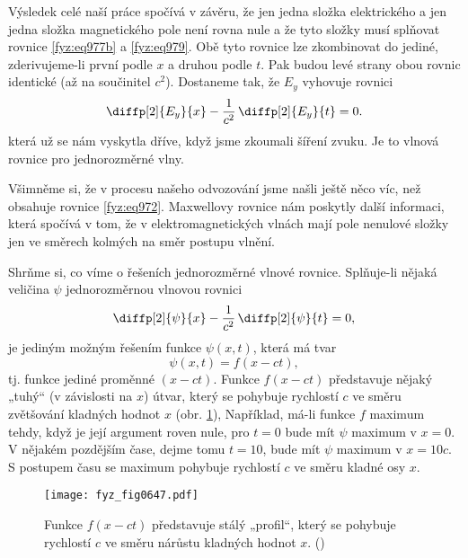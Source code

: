     Výsledek celé naší práce spočívá v závěru, že jen jedna složka elektrického a jen jedna složka
    magnetického pole není rovna nule a že tyto složky musí splňovat rovnice \eqref{fyz:eq977b} a
    \eqref{fyz:eq979}. Obě tyto rovnice lze zkombinovat do jediné, zderivujeme-li první podle \(x\)
    a druhou podle \(t\). Pak budou levé strany obou rovnic identické (až na součinitel \(c^2\)).
    Dostaneme tak, že \(E_y\) vyhovuje rovnici
    \begin{equation}\label{fyz:eq980}
      \diffp[2]{E_y}{x}-\dfrac{1}{c^2}\,\diffp[2]{E_y}{t}=0.
    \end{equation}
    která už se nám vyskytla dříve, když jsme zkoumali šíření zvuku. Je to vlnová rovnice pro
    jednorozměrné vlny.

    Všimněme si, že v procesu našeho odvozování jsme našli ještě něco víc, než obsahuje rovnice
    \eqref{fyz:eq972}. Maxwellovy rovnice nám poskytly další informaci, která spočívá v tom, že v
    elektromagnetických vlnách mají pole nenulové složky jen ve směrech kolmých na směr postupu
    vlnění.
    
    Shrňme si, co víme o řešeních jednorozměrné vlnové rovnice. Splňuje-li nějaká veličina
    \(\psi\) jednorozměrnou vlnovou rovnici
    \begin{equation}\label{fyz:eq981}
      \diffp[2]{\psi}{x}-\dfrac{1}{c^2}\,\diffp[2]{\psi}{t}=0,
    \end{equation}
    je jediným možným řešením funkce \(\psi(x, t)\), která má tvar
    \begin{equation}\label{fyz:eq982}
      \psi(x,t)=f(x-ct),
    \end{equation}
    tj. funkce jediné proměnné \((x - ct)\). Funkce \(f(x- ct)\) představuje nějaký „tuhý“ (v
    závislosti na \(x\)) útvar, který se pohybuje rychlostí \(c\) ve směru zvětšování kladných
    hodnot \(x\) (obr. \ref{fyz:fig0647}), Například, má-li funkce \(f\) maximum tehdy, když je její
    argument roven nule, pro \(t=0\) bude mít \(\psi\) maximum v \(x = 0\). V nějakém pozdějším
    čase, dejme tomu \(t= 10\), bude mít \(\psi\) maximum v \(x=10c\). S postupem času se maximum
    pohybuje rychlostí \(c\) ve směru kladné osy \(x\).

    \begin{figure}[ht!] %
      \centering
      \texttt{[image: fyz\_fig0647.pdf]}
      \caption{Funkce \(f(x-ct)\) představuje stálý „profil“, který se pohybuje rychlostí \(c\) ve
               směru nárůstu kladných hodnot \(x\). (\cite[s.~357]{Feynman02})}
      \label{fyz:fig0647}
    \end{figure}

